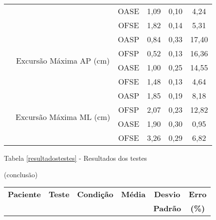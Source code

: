 \begin{apendicesenv}
\begin{table}[ht]
\begin{tabular}{|c|c|c|c|c|c|}
 &  & OASE & 1,09 & 0,10 & 4,24 \\ \cline{3-6} 
 &  & OFSE & 1,82 & 0,14 & 5,31 \\ \cline{2-6} 
 & \multirow{4}{*}{Excursão Máxima AP (cm)} & OASP & 0,84 & 0,33 & 17,40 \\ \cline{3-6} 
 &  & OFSP & 0,52 & 0,13 & 16,36 \\ \cline{3-6} 
 &  & OASE & 1,00 & 0,25 & 14,55 \\ \cline{3-6} 
 &  & OFSE & 1,48 & 0,13 & 4,64 \\ \cline{2-6} 
 & \multirow{4}{*}{Excursão Máxima ML (cm)} & OASP & 1,85 & 0,19 & 8,18 \\ \cline{3-6} 
 &  & OFSP & 2,07 & 0,23 & 12,82 \\ \cline{3-6} 
 &  & OASE & 1,90 & 0,30 & 0,95 \\ \cline{3-6} 
 &  & OFSE & 3,26 & 0,29 & 6,82 \\ \hline


\end{tabular}
\end{table}
\pagebreak


\begin{flushleft}
Tabela \ref{resultadostestes} - Resultados dos testes
\end{flushleft}

\begin{flushright}
(conclusão)
\end{flushright}

\begin{table}[ht]
\begin{tabular}{|c|c|c|c|c|c|}
\hline
 \textbf{Paciente}   & \textbf{Teste}                             & \textbf{Condição} & \textbf{Média} & \textbf{Desvio} & \textbf{Erro} \\
& & & & \textbf{Padrão} & \textbf{(\%)} \\ \hline


\end{tabular}
\end{table}
\end{apendicesenv}
